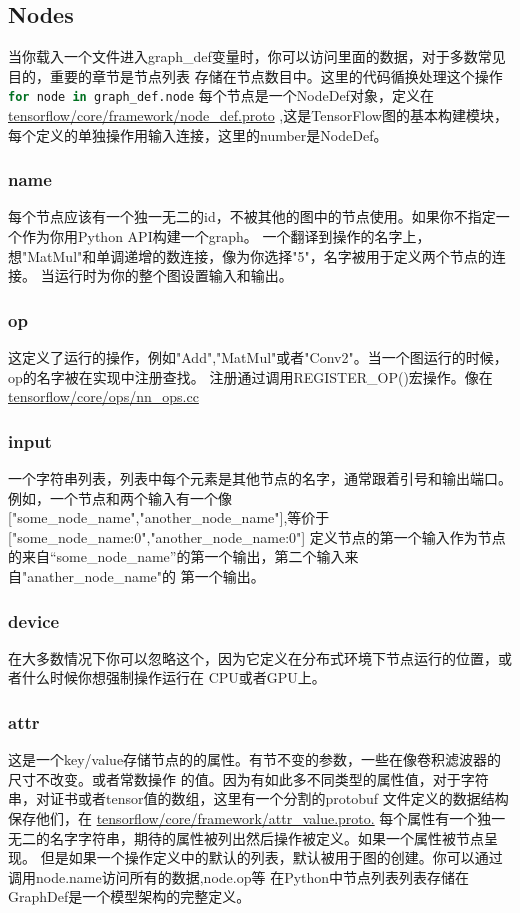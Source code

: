 \subsection{Nodes}
当你载入一个文件进入graph\_def变量时，你可以访问里面的数据，对于多数常见目的，重要的章节是节点列表
存储在节点数目中。这里的代码循换处理这个操作
\lstinline[language=Python]{for node in graph_def.node}
每个节点是一个NodeDef对象，定义在\href{https://github.com/tensorflow/tensorflow/blob/master/tensorflow/core/framework/node_def.proto}{tensorflow/core/framework/node\_def.proto}
,这是TensorFlow图的基本构建模块，每个定义的单独操作用输入连接，这里的number是NodeDef。
\subsubsection{name}
每个节点应该有一个独一无二的id，不被其他的图中的节点使用。如果你不指定一个作为你用Python API构建一个graph。
一个翻译到操作的名字上，想"MatMul"和单调递增的数连接，像为你选择"5"，名字被用于定义两个节点的连接。
当运行时为你的整个图设置输入和输出。
\subsubsection{op}
这定义了运行的操作，例如"Add","MatMul"或者"Conv2"。当一个图运行的时候，op的名字被在实现中注册查找。
注册通过调用REGISTER\_OP()宏操作。像在
\href{https://github.com/tensorflow/tensorflow/blob/master/tensorflow/core/ops/nn\_ops.cc}{tensorflow/core/ops/nn\_ops.cc}
\subsubsection{input}
一个字符串列表，列表中每个元素是其他节点的名字，通常跟着引号和输出端口。例如，一个节点和两个输入有一个像
["some\_node\_name","another\_node\_name"],等价于["some\_node\_name:0","another\_node\_name:0"]
定义节点的第一个输入作为节点的来自“some\_node\_name”的第一个输出，第二个输入来自"anather\_node\_name"的
第一个输出。
\subsubsection{device}
在大多数情况下你可以忽略这个，因为它定义在分布式环境下节点运行的位置，或者什么时候你想强制操作运行在
CPU或者GPU上。
\subsubsection{attr}
这是一个key/value存储节点的的属性。有节不变的参数，一些在像卷积滤波器的尺寸不改变。或者常数操作
的值。因为有如此多不同类型的属性值，对于字符串，对证书或者tensor值的数组，这里有一个分割的protobuf
文件定义的数据结构保存他们，在
\href{https://github.com/tensorflow/tensorflow/blob/master/tensorflow/core/framework/attr_value.proto}{tensorflow/core/framework/attr\_value.proto.}
每个属性有一个独一无二的名字字符串，期待的属性被列出然后操作被定义。如果一个属性被节点呈现。
但是如果一个操作定义中的默认的列表，默认被用于图的创建。你可以通过调用node.name访问所有的数据,node.op等
在Python中节点列表列表存储在GraphDef是一个模型架构的完整定义。
